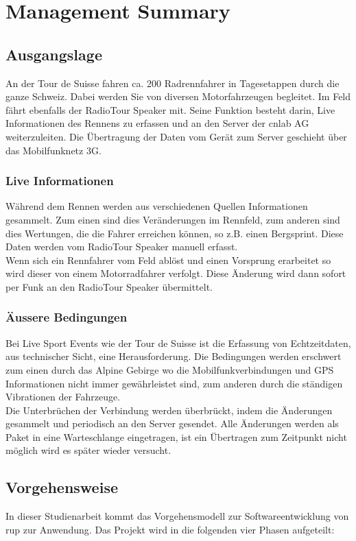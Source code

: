 \chapter*{Management Summary}

\section{Ausgangslage}
An der Tour de Suisse fahren ca. 200 Radrennfahrer in Tagesetappen durch die ganze Schweiz. Dabei werden Sie von diversen Motorfahrzeugen begleitet. Im Feld fährt ebenfalls der RadioTour Speaker mit. Seine Funktion besteht darin, Live Informationen des Rennens zu erfassen und an den Server der cnlab AG weiterzuleiten.  Die Übertragung der Daten vom Gerät zum Server geschieht über das Mobilfunknetz 3G.

\subsection{Live Informationen}
Während dem Rennen werden aus verschiedenen Quellen Informationen gesammelt. Zum einen sind dies Veränderungen im Rennfeld, zum anderen sind dies Wertungen, die die Fahrer erreichen können, so z.B. einen Bergsprint. Diese Daten werden vom RadioTour Speaker manuell erfasst.
\\
Wenn sich ein Rennfahrer vom Feld ablöst und einen Vorsprung erarbeitet so wird dieser von einem Motorradfahrer verfolgt. Diese Änderung wird dann sofort per Funk an den RadioTour Speaker übermittelt.

\subsection{Äussere Bedingungen}
Bei Live Sport Events wie der Tour de Suisse ist die Erfassung von Echtzeitdaten, aus technischer Sicht, eine Herausforderung. Die Bedingungen werden erschwert zum einen durch das Alpine Gebirge wo die Mobilfunkverbindungen und GPS Informationen nicht immer gewährleistet sind, zum anderen durch die ständigen Vibrationen der Fahrzeuge.
\\
Die Unterbrüchen der Verbindung werden überbrückt, indem die Änderungen gesammelt und periodisch an den Server gesendet. Alle Änderungen werden als Paket in eine Warteschlange eingetragen, ist ein Übertragen zum Zeitpunkt nicht möglich wird es später wieder versucht.


\section{Vorgehensweise}
In dieser Studienarbeit kommt das Vorgehensmodell zur Softwareentwicklung von \gls{rup} zur Anwendung. Das Projekt wird in die folgenden vier Phasen aufgeteilt:

